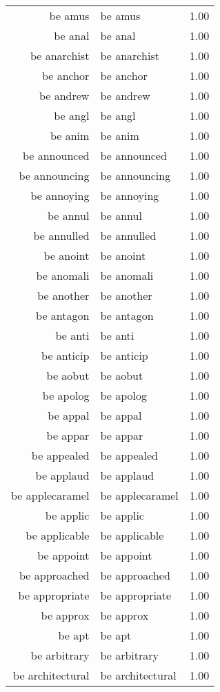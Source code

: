 \begin{table}[ht]
\begin{tabular}{rlr}
  be amus & be amus & 1.00 \\ 
  be anal & be anal & 1.00 \\ 
  be anarchist & be anarchist & 1.00 \\ 
  be anchor & be anchor & 1.00 \\ 
  be andrew & be andrew & 1.00 \\ 
  be angl & be angl & 1.00 \\ 
  be anim & be anim & 1.00 \\ 
  be announced & be announced & 1.00 \\ 
  be announcing & be announcing & 1.00 \\ 
  be annoying & be annoying & 1.00 \\ 
  be annul & be annul & 1.00 \\ 
  be annulled & be annulled & 1.00 \\ 
  be anoint & be anoint & 1.00 \\ 
  be anomali & be anomali & 1.00 \\ 
  be another & be another & 1.00 \\ 
  be antagon & be antagon & 1.00 \\ 
  be anti & be anti & 1.00 \\ 
  be anticip & be anticip & 1.00 \\ 
  be aobut & be aobut & 1.00 \\ 
  be apolog & be apolog & 1.00 \\ 
  be appal & be appal & 1.00 \\ 
  be appar & be appar & 1.00 \\ 
  be appealed & be appealed & 1.00 \\ 
  be applaud & be applaud & 1.00 \\ 
  be applecaramel & be applecaramel & 1.00 \\ 
  be applic & be applic & 1.00 \\ 
  be applicable & be applicable & 1.00 \\ 
  be appoint & be appoint & 1.00 \\ 
  be approached & be approached & 1.00 \\ 
  be appropriate & be appropriate & 1.00 \\ 
  be approx & be approx & 1.00 \\ 
  be apt & be apt & 1.00 \\ 
  be arbitrary & be arbitrary & 1.00 \\ 
  be architectural & be architectural & 1.00 \\ 

\end{tabular}
\end{table}
